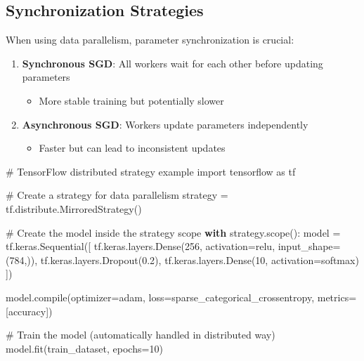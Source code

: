 \documentclass[
  letterpaper,
  DIV=11,
  numbers=noendperiod]{scrreprt}
\newenvironment{Shaded}{\begin{snugshade}}{\end{snugshade}}
\newcommand{\BuiltInTok}[1]{\textcolor[rgb]{0.00,0.23,0.31}{#1}}
\newcommand{\CommentTok}[1]{\textcolor[rgb]{0.37,0.37,0.37}{#1}}
\newcommand{\ControlFlowTok}[1]{\textcolor[rgb]{0.00,0.23,0.31}{\textbf{#1}}}
\newcommand{\DecValTok}[1]{\textcolor[rgb]{0.68,0.00,0.00}{#1}}
\newcommand{\FloatTok}[1]{\textcolor[rgb]{0.68,0.00,0.00}{#1}}
\newcommand{\ImportTok}[1]{\textcolor[rgb]{0.00,0.46,0.62}{#1}}
\newcommand{\NormalTok}[1]{\textcolor[rgb]{0.00,0.23,0.31}{#1}}
\newcommand{\OperatorTok}[1]{\textcolor[rgb]{0.37,0.37,0.37}{#1}}
\newcommand{\StringTok}[1]{\textcolor[rgb]{0.13,0.47,0.30}{#1}}
\providecommand{\tightlist}{%
  \setlength{\itemsep}{0pt}\setlength{\parskip}{0pt}}\usepackage{longtable,booktabs,array}
\begin{document}
\subsection{Synchronization
Strategies}\label{synchronization-strategies}

When using data parallelism, parameter synchronization is crucial:

\begin{enumerate}
\def\labelenumi{\arabic{enumi}.}
\tightlist
\item
  \textbf{Synchronous SGD}: All workers wait for each other before
  updating parameters

  \begin{itemize}
  \tightlist
  \item
    More stable training but potentially slower
  \end{itemize}
\item
  \textbf{Asynchronous SGD}: Workers update parameters independently

  \begin{itemize}
  \tightlist
  \item
    Faster but can lead to inconsistent updates
  \end{itemize}
\end{enumerate}

\begin{Shaded}
\begin{Highlighting}[]
\CommentTok{\# TensorFlow distributed strategy example}
\ImportTok{import}\NormalTok{ tensorflow }\ImportTok{as}\NormalTok{ tf}

\CommentTok{\# Create a strategy for data parallelism}
\NormalTok{strategy }\OperatorTok{=}\NormalTok{ tf.distribute.MirroredStrategy()}

\CommentTok{\# Create the model inside the strategy scope}
\ControlFlowTok{with}\NormalTok{ strategy.scope():}
\NormalTok{    model }\OperatorTok{=}\NormalTok{ tf.keras.Sequential([}
\NormalTok{        tf.keras.layers.Dense(}\DecValTok{256}\NormalTok{, activation}\OperatorTok{=}\StringTok{\textquotesingle{}relu\textquotesingle{}}\NormalTok{, input\_shape}\OperatorTok{=}\NormalTok{(}\DecValTok{784}\NormalTok{,)),}
\NormalTok{        tf.keras.layers.Dropout(}\FloatTok{0.2}\NormalTok{),}
\NormalTok{        tf.keras.layers.Dense(}\DecValTok{10}\NormalTok{, activation}\OperatorTok{=}\StringTok{\textquotesingle{}softmax\textquotesingle{}}\NormalTok{)}
\NormalTok{    ])}
    
\NormalTok{    model.}\BuiltInTok{compile}\NormalTok{(optimizer}\OperatorTok{=}\StringTok{\textquotesingle{}adam\textquotesingle{}}\NormalTok{,}
\NormalTok{                  loss}\OperatorTok{=}\StringTok{\textquotesingle{}sparse\_categorical\_crossentropy\textquotesingle{}}\NormalTok{,}
\NormalTok{                  metrics}\OperatorTok{=}\NormalTok{[}\StringTok{\textquotesingle{}accuracy\textquotesingle{}}\NormalTok{])}

\CommentTok{\# Train the model (automatically handled in distributed way)}
\NormalTok{model.fit(train\_dataset, epochs}\OperatorTok{=}\DecValTok{10}\NormalTok{)}
\end{Highlighting}
\end{Shaded}
\end{document}
